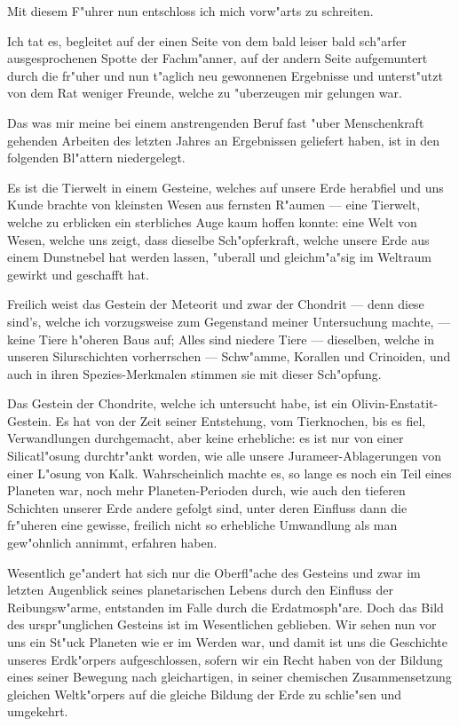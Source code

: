 \documentclass[a4paper, 11pt, oneside]{article}
\begin{document}
Mit diesem F"uhrer nun entschloss ich mich vorw"arts zu schreiten.

Ich tat es, begleitet auf der einen Seite von dem bald leiser bald sch"arfer ausgesprochenen Spotte der Fachm"anner, auf der andern Seite aufgemuntert durch die fr"uher und nun t"aglich neu gewonnenen Ergebnisse und unterst"utzt von dem Rat weniger Freunde, welche zu "uberzeugen mir gelungen war.

Das was mir meine bei einem anstrengenden Beruf fast "uber Menschenkraft gehenden Arbeiten des letzten Jahres an Ergebnissen geliefert haben, ist in den folgenden Bl"attern niedergelegt.

Es ist die Tierwelt in einem Gesteine, welches auf unsere Erde herabfiel und uns Kunde brachte von kleinsten Wesen aus fernsten R"aumen --- eine Tierwelt, welche zu erblicken ein sterbliches Auge kaum hoffen konnte: eine Welt von Wesen, welche uns zeigt, dass dieselbe Sch"opferkraft, welche unsere Erde aus einem Dunstnebel hat werden lassen, "uberall und gleichm"a"sig im Weltraum gewirkt und geschafft hat.

Freilich weist das Gestein der Meteorit und zwar der Chondrit --- denn diese sind's, welche ich vorzugsweise zum Gegenstand meiner Untersuchung machte, --- keine Tiere h"oheren Baus auf; Alles sind niedere Tiere --- dieselben, welche in unseren Silurschichten vorherrschen --- Schw"amme, Korallen und Crinoiden, und auch in ihren Spezies-Merkmalen stimmen sie mit dieser Sch"opfung.

Das Gestein der Chondrite, welche ich untersucht habe, ist ein Olivin-Enstatit-Gestein. Es hat von der Zeit seiner Entstehung, vom Tierknochen, bis es fiel, Verwandlungen durchgemacht, aber keine erhebliche: es ist nur von einer Silicatl"osung durchtr"ankt worden, wie alle unsere Jurameer-Ablagerungen von einer L"osung von Kalk. Wahrscheinlich machte es, so lange es noch ein Teil eines Planeten war, noch mehr Planeten-Perioden durch, wie auch den tieferen Schichten unserer Erde andere gefolgt sind, unter deren Einfluss dann die fr"uheren eine gewisse, freilich nicht so erhebliche Umwandlung als man gew"ohnlich annimmt, erfahren haben.

Wesentlich ge"andert hat sich nur die Oberfl"ache des Gesteins und zwar im letzten Augenblick seines planetarischen Lebens durch den Einfluss der Reibungsw"arme, entstanden im Falle durch die Erdatmosph"are. Doch das Bild des urspr"unglichen Gesteins ist im Wesentlichen geblieben. Wir sehen nun vor uns ein St"uck Planeten wie er im Werden war, und damit ist uns die Geschichte unseres Erdk"orpers aufgeschlossen, sofern wir ein Recht haben von der Bildung eines seiner Bewegung nach gleichartigen, in seiner chemischen Zusammensetzung gleichen Weltk"orpers auf die gleiche Bildung der Erde zu schlie"sen und umgekehrt.
\end{document}
